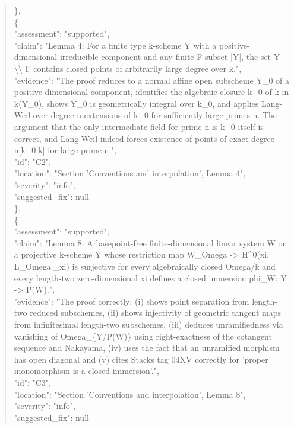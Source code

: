 \documentclass[11pt]{article}
\begin{document}
\begin{quote}
    \},\\
    \{\\
      "assessment": "supported",\\
      "claim": "Lemma 4: For a finite type k-scheme Y with a positive-dimensional irreducible component and any finite F subset |Y|, the set Y \textbackslash{}\textbackslash{} F contains closed points of arbitrarily large degree over k.",\\
      "evidence": "The proof reduces to a normal affine open subscheme Y\_0 of a positive-dimensional component, identifies the algebraic closure k\_0 of k in k(Y\_0), shows Y\_0 is geometrically integral over k\_0, and applies Lang-Weil over degree-n extensions of k\_0 for sufficiently large primes n. The argument that the only intermediate field for prime n is k\_0 itself is correct, and Lang-Weil indeed forces existence of points of exact degree n[k\_0:k] for large prime n.",\\
      "id": "C2",\\
      "location": "Section 'Conventions and interpolation', Lemma 4",\\
      "severity": "info",\\
      "suggested\_fix": null\\
    \},\\
    \{\\
      "assessment": "supported",\\
      "claim": "Lemma 8: A basepoint-free finite-dimensional linear system W on a projective k-scheme Y whose restriction map W\_Omega -> H\^{}0(xi, L\_Omega|\_xi) is surjective for every algebraically closed Omega/k and every length-two zero-dimensional xi defines a closed immersion phi\_W: Y -> P(W).",\\
      "evidence": "The proof correctly: (i) shows point separation from length-two reduced subschemes, (ii) shows injectivity of geometric tangent maps from infinitesimal length-two subschemes, (iii) deduces unramifiedness via vanishing of Omega\_\{Y/P(W)\} using right-exactness of the cotangent sequence and Nakayama, (iv) uses the fact that an unramified morphism has open diagonal and (v) cites Stacks tag 04XV correctly for 'proper monomorphism is a closed immersion'.",\\
      "id": "C3",\\
      "location": "Section 'Conventions and interpolation', Lemma 8",\\
      "severity": "info",\\
      "suggested\_fix": null\\

\end{quote}
\end{document}
